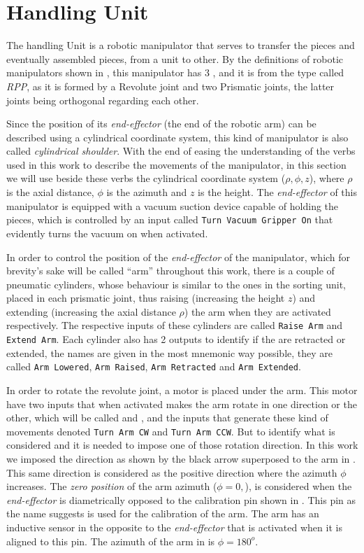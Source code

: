\section{Handling Unit}
\label{sec:handlingUnit}
The handling Unit is a robotic manipulator that serves to transfer the pieces
and eventually assembled pieces, from a unit to other. By the definitions of
robotic manipulators shown in \cite{khalil2004modeling}, this manipulator has 3
\DOF{}, and it is from the type called \emph{RPP}, as
it is formed by a Revolute joint and two Prismatic joints, the latter joints
being orthogonal regarding each other.

Since the position of its
\emph{end-effector} (the end of the robotic arm) can be described using a
cylindrical coordinate system, this kind of manipulator is also called
\emph{cylindrical shoulder}. With the end of easing the understanding of the
verbs used in this work to describe the movements of the manipulator, in this
section we will use beside these verbs the cylindrical coordinate
system ($\rho,\phi,z$), where $\rho$ is the axial distance, $\phi$ is the azimuth
and $z$ is the height.
The \emph{end-effector} of this manipulator is equipped with a vacuum suction
device capable of holding the pieces, which is controlled by an input called
\verb|Turn Vacuum Gripper On| that evidently turns the vacuum on when activated.

In order to control the position of the \emph{end-effector} of the manipulator, which for brevity's sake will be called
``arm'' throughout this work, there is a couple of pneumatic cylinders, whose
behaviour is similar
to the ones in the sorting unit, placed in each
prismatic joint, thus raising (increasing the height $z$) and extending (increasing the
axial distance $\rho$) the arm when they are activated respectively. The
respective inputs
of these cylinders are called \verb|Raise Arm| and \verb|Extend Arm|. Each
cylinder also has 2 outputs to identify if the are retracted or extended, the
names are given in the most mnemonic way possible, they are called
\verb|Arm Lowered|, \verb|Arm Raised|, \verb|Arm Retracted| and
\verb|Arm Extended|.

In order to rotate the revolute joint, a motor is placed
under the arm. This motor have two inputs that when activated makes the arm
rotate in one direction or the other, which will be called \CW{} and \CCW, and
the inputs that generate these kind of movements denoted
\verb|Turn Arm CW| and \verb|Turn Arm CCW|. But to identify what is considered
\CW{} and \CCW{} it is needed to impose one of those rotation direction. In this
work we imposed the \CCW{} direction as shown by the black arrow superposed to
the arm in . This same direction is considered as the
positive direction where the azimuth $\phi$ increases. The
\emph{zero position} of the arm azimuth ($\phi=0,$), is considered when the
\emph{end-effector} is diametrically opposed to the calibration pin shown in
. This pin as the name suggests is used for the
calibration of the arm. The arm has an inductive sensor in the opposite to the
\emph{end-effector} that is activated when
it is aligned to this pin.  The azimuth of the arm in  is
$\phi=180^o$.

